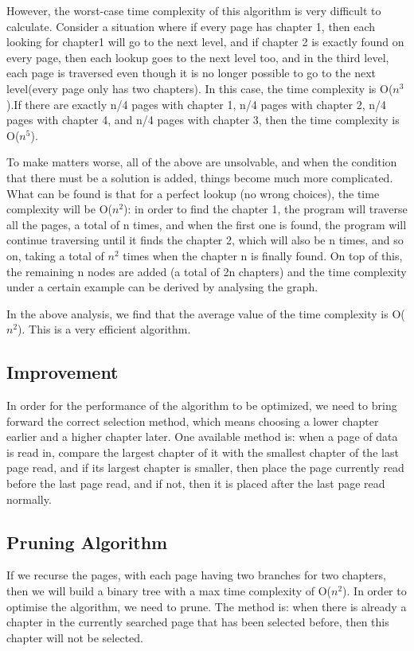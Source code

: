 \documentclass[20pt]{ctexart}
\begin{document}
However, the worst-case time complexity of this algorithm is very difficult to calculate. Consider a situation where if every page has chapter 1, then each looking for chapter1 will go to the next level, 
and if chapter 2 is exactly found on every page, then each lookup goes to the next level too, and in the third level, each page is traversed even though it is no longer possible to go to the next level(every page only has two chapters).
In this case, the time complexity is O($n^3$).If there are exactly n/4 pages with chapter 1, n/4 pages with chapter 2, n/4 pages with chapter 4, and n/4 pages with chapter 3, then the time complexity is O($n^5$).

To make matters worse, all of the above are unsolvable, and when the condition that there must be a solution is added, things become much more complicated. 
What can be found is that for a perfect lookup (no wrong choices), the time complexity will be O($n^2$): in order to find the chapter 1, the program will traverse all the pages, a total of n times, 
and when the first one is found, the program will continue traversing until it finds the chapter 2, which will also be n times, and so on, taking a total of $n^2$ times when the chapter n is finally found.
On top of this, the remaining n nodes are added (a total of 2n chapters) and the time complexity under a certain example can be derived by analysing the graph.

In the above analysis, we find that the average value of the time complexity is O($n^2$). This is a very efficient algorithm.

\subsection{Improvement}
In order for the performance of the algorithm to be optimized, we need to bring forward the correct selection method, which means choosing a lower chapter earlier and a higher chapter later. 
One available method is: when a page of data is read in, compare the largest chapter of it with the smallest chapter of the last page read, and if its largest chapter is smaller, 
then place the page currently read before the last page read, and if not, then it is placed after the last page read normally.


\subsection{Pruning Algorithm}
If we recurse the pages, with each page having two branches for two chapters, then we will build a binary tree with a max time complexity of O($n^2$).
In order to optimise the algorithm, we need to prune. The method is: when there is already a chapter in the currently searched page that has been selected before, then this chapter will not be selected.
\end{document}
